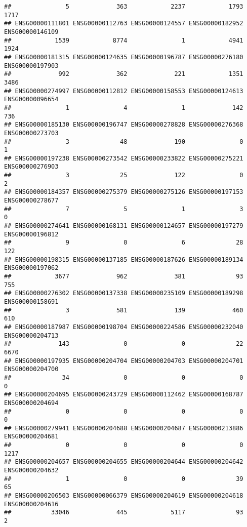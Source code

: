 \documentclass[
]{article}
\begin{document}
\begin{verbatim}
##               5             363            2237            1793            1717 
## ENSG00000111801 ENSG00000112763 ENSG00000124557 ENSG00000182952 ENSG00000146109 
##            1539            8774               1            4941            1924 
## ENSG00000181315 ENSG00000124635 ENSG00000196787 ENSG00000276180 ENSG00000197903 
##             992             362             221            1351            3486 
## ENSG00000274997 ENSG00000112812 ENSG00000158553 ENSG00000124613 ENSG00000096654 
##               1               4               1             142             736 
## ENSG00000185130 ENSG00000196747 ENSG00000278828 ENSG00000276368 ENSG00000273703 
##               3              48             190               0               1 
## ENSG00000197238 ENSG00000273542 ENSG00000233822 ENSG00000275221 ENSG00000276903 
##               3              25             122               0               2 
## ENSG00000184357 ENSG00000275379 ENSG00000275126 ENSG00000197153 ENSG00000278677 
##               7               5               1               3               0 
## ENSG00000274641 ENSG00000168131 ENSG00000124657 ENSG00000197279 ENSG00000196812 
##               9               0               6              28             122 
## ENSG00000198315 ENSG00000137185 ENSG00000187626 ENSG00000189134 ENSG00000197062 
##            3677             962             381              93             755 
## ENSG00000276302 ENSG00000137338 ENSG00000235109 ENSG00000189298 ENSG00000158691 
##               3             581             139             460             610 
## ENSG00000187987 ENSG00000198704 ENSG00000224586 ENSG00000232040 ENSG00000204713 
##             143               0               0              22            6670 
## ENSG00000197935 ENSG00000204704 ENSG00000204703 ENSG00000204701 ENSG00000204700 
##              34               0               0               0               0 
## ENSG00000204695 ENSG00000243729 ENSG00000112462 ENSG00000168787 ENSG00000204694 
##               0               0               0               0               0 
## ENSG00000279941 ENSG00000204688 ENSG00000204687 ENSG00000213886 ENSG00000204681 
##               0               0               0               0            1217 
## ENSG00000204657 ENSG00000204655 ENSG00000204644 ENSG00000204642 ENSG00000204632 
##               1               0               0              39              65 
## ENSG00000206503 ENSG00000066379 ENSG00000204619 ENSG00000204618 ENSG00000204616 
##           33046             445            5117              93               2 

\end{verbatim}
\end{document}
